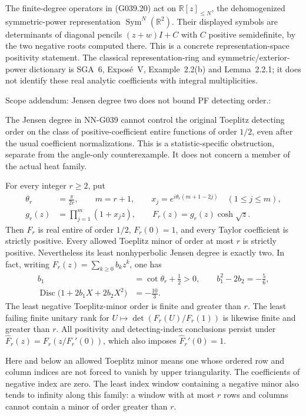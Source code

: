 \begin{geometricstatement}[NN-G039]
The finite-degree operators in (G039.20) act on
$\mathbb R[z]_{\le N}$, the dehomogenized symmetric-power
representation $\operatorname{Sym}^N(\mathbb R^2)$.
Their displayed symbols are determinants of diagonal pencils
$(z+w)I+C$ with $C$ positive semidefinite, by the two negative
roots computed there. This is a concrete representation-space
positivity statement. The classical representation-ring and
symmetric/exterior-power dictionary is SGA~6, Expos\'e~V,
Example~2.2(b) and Lemma~2.2.1; it does not identify these
real analytic coefficients with integral multiplicities.


Scope addendum: Jensen degree two does not bound PF detecting order.:

The Jensen degree in NN-G039 cannot control the original Toeplitz
detecting order on the class of positive-coefficient entire functions
of order $1/2$, even after the usual coefficient normalizations.
This is a statistic-specific obstruction, separate from the angle-only
counterexample. It does not concern a member of the actual heat family.

For every integer $r\ge2$, put
\[
 \begin{aligned}
 \theta_r&=\frac{\pi}{2r},\qquad m=r+1,\qquad
 x_j=e^{i\theta_r(m+1-2j)}\quad(1\le j\le m),\\
 g_r(z)&=\prod_{j=1}^{m}(1+x_jz),
 \qquad F_r(z)=g_r(z)\cosh\sqrt z.
 \end{aligned}
 \tag{G039.PF1}
\]
Then $F_r$ is real entire of order $1/2$, $F_r(0)=1$, and
every Taylor coefficient is strictly positive. Every allowed
Toeplitz minor of order at most $r$ is strictly positive.
Nevertheless its least nonhyperbolic Jensen degree is exactly two.
In fact, writing $F_r(z)=\sum_{k\ge0}b_kz^k$, one has
\[
 \begin{aligned}
 b_1&=\cot\theta_r+\frac12>0,\qquad
 b_1^2-2b_2=-\frac56,\\
 \operatorname{Disc}\bigl(1+2b_1X+2b_2X^2\bigr)&=-\frac{10}{3}.
 \end{aligned}
 \tag{G039.PF2}
\]
The least negative Toeplitz-minor order is finite and greater
than $r$. The least failing finite unitary rank for
$U\mapsto\det(F_r(U)/F_r(1))$ is likewise finite and greater
than $r$. All positivity and detecting-index conclusions persist under
$\widehat F_r(z)=F_r(z/F_r'(0))$, which also imposes
$\widehat F_r'(0)=1$.

Here and below an allowed Toeplitz minor means one whose ordered
row and column indices are not forced to vanish by upper
triangularity. The coefficients of negative index are zero.
The least index window containing a negative minor also tends
to infinity along this family: a window with at most $r$ rows
and columns cannot contain a minor of order greater than $r$.



\end{geometricstatement}

